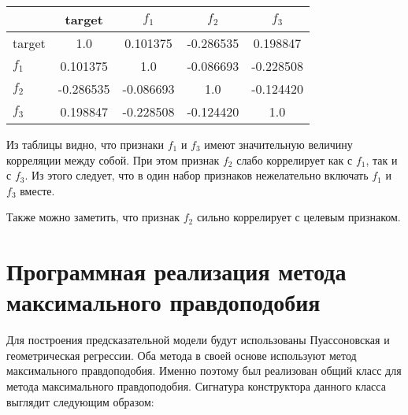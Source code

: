 \begin{center}
\begin{tabular}{|l|c|c|c|c|}
    \hline
    & target & $f_1$ & $f_2$ & $f_3$ \\ \hline
    target & 1.0       & 0.101375  & -0.286535 & 0.198847  \\ \hline
    $f_1$  & 0.101375  & 1.0       & -0.086693 & -0.228508 \\ \hline
    $f_2$  & -0.286535 & -0.086693 & 1.0       & -0.124420 \\ \hline
    $f_3$  & 0.198847  & -0.228508 & -0.124420 & 1.0       \\ \hline
\end{tabular}
\label{tab:corr_new_features}
\end{center}

Из таблицы видно, что признаки $f_1$ и $f_3$ имеют значительную величину корреляции между собой. При этом признак $f_2$ слабо коррелирует как с $f_1$, так и с $f_3$. Из этого следует, что в один набор признаков нежелательно включать $f_1$ и $f_3$ вместе.

Также можно заметить, что признак $f_2$ сильно коррелирует с целевым признаком.


\section{Программная реализация метода максимального правдоподобия}

Для построения предсказательной модели будут использованы Пуассоновская и геометрическая регрессии. Оба метода в своей основе используют метод максимального правдоподобия. Именно поэтому был реализован общий класс для метода максимального правдоподобия. Сигнатура конструктора данного класса выглядит следующим образом:

